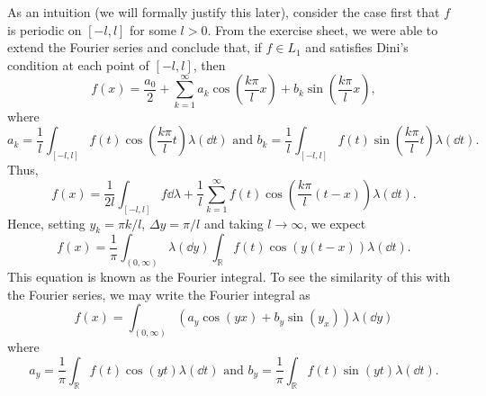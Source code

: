 \documentclass[]{article}
\theoremstyle{definition}
\theoremstyle{definition}
\begin{document}
As an intuition (we will formally justify this later), consider the case first that 
\(f\) is periodic on \([-l, l]\) for some \(l > 0\). 
From the exercise sheet, we were able to extend the Fourier series and conclude that, 
if \(f \in L_1\) and satisfies Dini's condition at each point of \([-l, l]\), then 
\[f(x) = \frac{a_0}{2} + \sum_{k = 1}^\infty a_k\cos\left(\frac{k\pi}{l}x\right) + b_k \sin\left(\frac{k\pi}{l}x\right),\]
where 
\[a_k = \frac{1}{l}\int_{[-l, l]}f(t) \cos\left(\frac{k\pi}{l}t\right) \lambda(\dd t) \text{ and }
  b_k = \frac{1}{l}\int_{[-l, l]}f(t) \sin\left(\frac{k\pi}{l}t\right) \lambda(\dd t).\]
Thus,
\[f(x) = \frac{1}{2l} \int_{[-l, l]} f \dd \lambda + \frac{1}{l}\sum_{k = 1}^\infty f(t) 
  \cos\left(\frac{k\pi}{l}(t - x)\right)\lambda(\dd t).\]
Hence, setting \(y_k = \pi k / l\), \(\Delta y = \pi / l\) and 
taking \(l \to \infty\), we expect 
\[f(x) = \frac{1}{\pi} \int_{(0, \infty)} \lambda(\dd y) \int_{\mathbb{R}} f(t) \cos(y(t - x)) \lambda(\dd t).\]
This equation is known as the Fourier integral. To see the similarity of this with 
the Fourier series, we may write the Fourier integral as 
\[f(x) = \int_{(0, \infty)}(a_y \cos(yx) + b_y \sin(y_x)) \lambda(\dd y)\]
where 
\[a_y = \frac{1}{\pi} \int_{\mathbb{R}} f(t) \cos(yt) \lambda(\dd t) \text{ and }
  b_y = \frac{1}{\pi} \int_{\mathbb{R}} f(t) \sin(yt) \lambda(\dd t).\]
\end{document}

